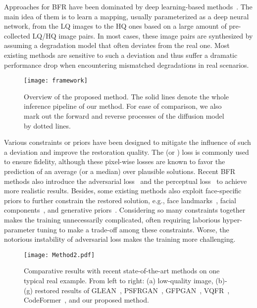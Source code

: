\documentclass[10pt,twocolumn,letterpaper]{article}
\begin{document}
Approaches for BFR have been dominated by deep learning-based methods~\cite{wang2021towards,tu2021joint,feihong2022toward,gu2022vqfr}. The main idea of them is to learn a mapping, usually parameterized as a deep neural network, from the LQ images to the HQ ones based on a large amount of pre-collected LQ/HQ image pairs. In most cases, these image pairs are synthesized by assuming a degradation model that often deviates from the real one. Most existing methods are sensitive to such a deviation and thus suffer a dramatic performance drop when encountering mismatched degradations in real scenarios.
\begin{figure}[t]
    \centering
    \texttt{[image: framework]}
    \caption{Overview of the proposed method. The solid lines 
        denote the whole inference pipeline of our method. For ease
        of comparison, we also mark out the forward and reverse processes
        of the diffusion model by dotted lines.}
    \label{fig:framework}
    \vspace{-2mm}
\end{figure}

Various constraints or priors have been designed to mitigate the influence of such a deviation and improve the restoration quality. The  (or ) loss is commonly used to ensure fidelity, although these pixel-wise losses are known to favor the prediction of an average (or a median) over plausible solutions.
Recent BFR methods also introduce the adversarial loss~\cite{goodfellow2014generative} and the perceptual loss~\cite{johnson2016perceptual,zhang2018unreasonable} to achieve more realistic results.
Besides, some existing methods also exploit face-specific priors to further constrain the restored solution, e.g., face landmarks~\cite{chen2018fsrnet}, facial components~\cite{li2020blind}, and generative priors~\cite{chan2021glean,pan2021exploiting,wang2021towards,yang2021gan,toward2022zhou}.
Considering so many constraints together makes the training unnecessarily complicated, often requiring laborious hyper-parameter tuning to make a trade-off among these constraints.
Worse, the notorious instability of adversarial loss makes the training more challenging. 

\begin{figure*}[h]
    \centering
    \texttt{[image: Method2.pdf]}
    \caption{Comparative results with recent state-of-the-art methods on one typical real example. From left to right:
        (a) low-quality image, (b)-(g) restored results of GLEAN~\cite{chan2021glean}, PSFRGAN~\cite{chen2021progressive},
    GFPGAN~\cite{wang2021towards}, VQFR~\cite{gu2022vqfr}, CodeFormer~\cite{toward2022zhou}, and our proposed method.}
    \label{fig:method_visulization}
\end{figure*}
\end{document}
